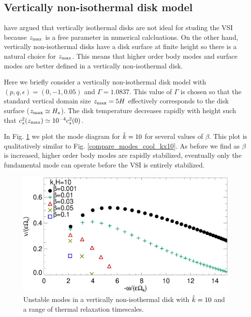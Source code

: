 \subsection{Vertically non-isothermal disk model} 
\cite{barker15} have argued that vertically isothermal disks are not
ideal for studing the VSI because $z_\mathrm{max}$ is a free
parameter in numerical calcluations. On the other hand, vertically
non-isothermal disks have a disk surface at finite height so there is
a natural choice for $z_\mathrm{max}$. This means that higher order body modes and
surface modes are better defined in a vertically non-isothermal disk.   


Here we briefly consider a vertically non-isothermal disk model with  
$(p,q,\epsilon)=(0,-1,0.05)$ and $\Gamma=1.0837$. This value of 
$\Gamma$ is chosen so that the standard vertical domain size $z_\mathrm{max} =
5H$ effectively corresponds to the disk surface ($z_\mathrm{max}\simeq
H_s$). The disk temperature decreases rapidly with height such that 
$c_s^2(z_\mathrm{max})\simeq 10^{-4}c_s^2(0)$.    

In Fig. \ref{compare_modes_vnoniso_kx10} we plot the mode diagram for
$\hat{k}=10$ for several values of $\beta$. This plot is 
qualitatively similar to Fig. \ref{compare_modes_cool_kx10}. As before
we find as $\beta$ is increased, higher order body modes are rapidly
stabilized, eventually only the fundamental mode can operate before
the VSI is entirely stabilized.  

\begin{figure}
  \includegraphics[width=\linewidth,clip=true,trim=0cm 0cm 0cm
  0cm]{figures/compare_modes_Gam1.084_kx10.ps}
  \caption{Unstable modes in a vertically non-isothermal disk with
    $\hat{k}=10$ and a range of thermal relaxation timescales.  
    \label{compare_modes_vnoniso_kx10}}
\end{figure}

